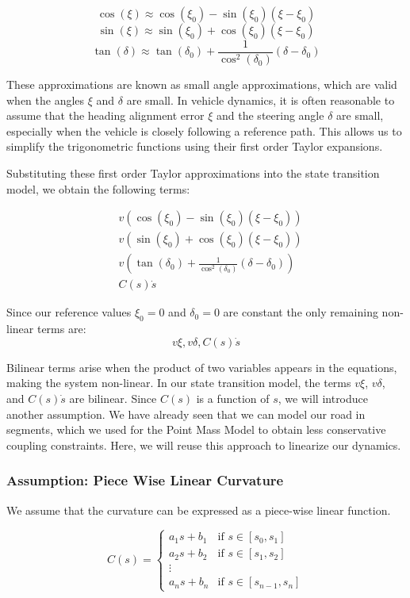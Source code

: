 \[ \cos(\xi) \approx
	\cos(\xi_0) - \sin(\xi_0) (\xi - \xi_0) \] \[ \sin(\xi) \approx \sin(\xi_0) + \cos(\xi_0) (\xi - \xi_0) \] \[ \tan(\delta) \approx \tan(\delta_0) +
	\frac{1}{\cos^2(\delta_0)} (\delta - \delta_0) \]

These approximations are known as small angle approximations, which are valid
when the angles $\xi$ and $\delta$ are small.
In vehicle dynamics, it is often reasonable to assume that the heading alignment error $\xi$ and the steering angle $\delta$ are small, especially
when the vehicle is closely following a reference path.
This allows us to simplify the trigonometric functions using their first order Taylor expansions.

Substituting these first order Taylor approximations into the state transition model, we obtain the following terms:

\begin{align*}
	 & v (\cos(\xi_0) - \sin(\xi_0) (\xi - \xi_0))                         \\
	 & v (\sin(\xi_0) + \cos(\xi_0) (\xi - \xi_0))                         \\
	 & v (\tan(\delta_0) + \frac{1}{\cos^2(\delta_0)} (\delta - \delta_0)) \\
	 & C(s)\dot{s}
\end{align*}

Since our reference values $\xi_0 = 0$ and $\delta_0 = 0$ are constant the only remaining non-linear terms are: $$v \xi, v \delta, C(s)\dot{s}$$

Bilinear terms arise when the product of two variables appears in the equations, making the system non-linear.
In our state transition model, the terms \(v \xi\), \(v \delta\), and \(C(s)\dot{s}\) are bilinear.
Since \(C(s)\) is a function of \(s\), we will introduce another assumption.
We have already seen that we can model our road in segments, which we used for the Point Mass Model to obtain less conservative coupling constraints.
Here, we will reuse this approach to linearize our dynamics.

\subsubsection{Assumption: Piece Wise Linear Curvature}

We assume that the curvature can be expressed as a piece-wise linear function.

\[
	C(s) = \begin{cases}
		a_1s+b_1 & \text{if } s \in [s_0, s_1]     \\
		a_2s+b_2 & \text{if } s \in [s_1, s_2]     \\
		\vdots                                     \\
		a_ns+b_n & \text{if } s \in [s_{n-1}, s_n]
	\end{cases}
\]


